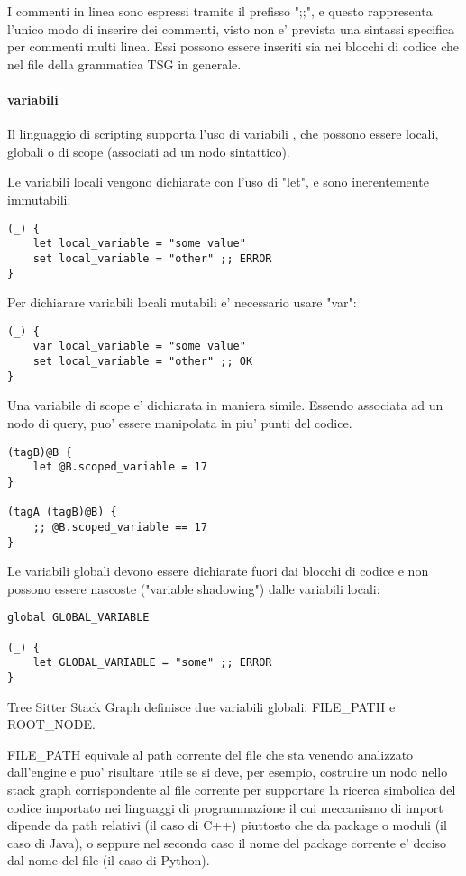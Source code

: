 I commenti in linea sono espressi tramite il prefisso ";;", e questo rappresenta l'unico modo di inserire dei commenti, visto non e' prevista una sintassi specifica per commenti multi linea.
Essi possono essere inseriti sia nei blocchi di codice che nel file della grammatica TSG in generale.

\paragraph{variabili}
Il linguaggio di scripting supporta l'uso di variabili \cite{TreeSitterGraphReferenceVariables}, che possono essere locali, globali o di scope (associati ad un nodo sintattico).

Le variabili locali vengono dichiarate con l'uso di "let", e sono inerentemente immutabili:

\begin{Verbatim}[samepage=true]
(_) {
    let local_variable = "some value"
    set local_variable = "other" ;; ERROR
}
\end{Verbatim}

Per dichiarare variabili locali mutabili e' necessario usare "var":

\begin{Verbatim}[samepage=true]
(_) {
    var local_variable = "some value"
    set local_variable = "other" ;; OK
}
\end{Verbatim}

Una variabile di scope e' dichiarata in maniera simile. Essendo associata ad un nodo di query, puo' essere manipolata in piu' punti del codice.

\begin{Verbatim}[samepage=true]
(tagB)@B {
    let @B.scoped_variable = 17
}

(tagA (tagB)@B) {
    ;; @B.scoped_variable == 17
}
\end{Verbatim}

Le variabili globali devono essere dichiarate fuori dai blocchi di codice e non possono essere nascoste ("variable shadowing") dalle variabili locali:

\begin{Verbatim}[samepage=true]
global GLOBAL_VARIABLE

(_) {
    let GLOBAL_VARIABLE = "some" ;; ERROR
}
\end{Verbatim}

Tree Sitter Stack Graph definisce due variabili globali: FILE\_PATH e ROOT\_NODE.

FILE\_PATH equivale al path corrente del file che sta venendo analizzato dall'engine e puo' risultare utile se si deve, per esempio, costruire un nodo nello stack graph corrispondente al file corrente per supportare la ricerca simbolica del codice importato nei linguaggi di programmazione il cui meccanismo di import dipende da path relativi (il caso di C++) piuttosto che da package o moduli (il caso di Java), o seppure nel secondo caso il nome del package corrente e' deciso dal nome del file (il caso di Python).

